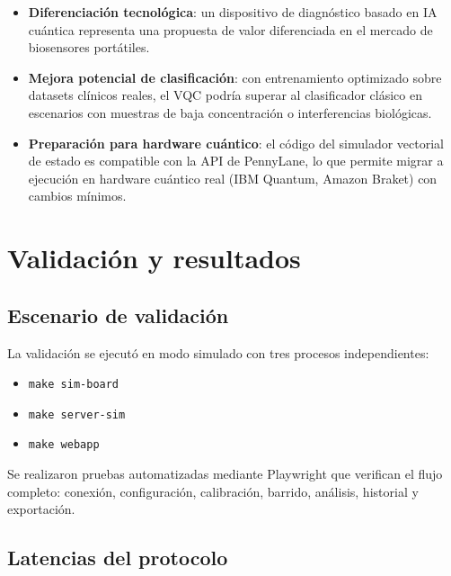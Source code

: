 \documentclass[11pt,a4paper,spanish]{book}
\begin{document}
\begin{itemize}
	\item \textbf{Diferenciaci\'{o}n tecnol\'{o}gica}: un dispositivo de diagn\'{o}stico basado en IA cu\'{a}ntica representa una propuesta de valor diferenciada en el mercado de biosensores port\'{a}tiles.
	\item \textbf{Mejora potencial de clasificaci\'{o}n}: con entrenamiento optimizado sobre datasets cl\'{i}nicos reales, el VQC podr\'{i}a superar al clasificador cl\'{a}sico en escenarios con muestras de baja concentraci\'{o}n o interferencias biol\'{o}gicas.
	\item \textbf{Preparaci\'{o}n para hardware cu\'{a}ntico}: el c\'{o}digo del simulador vectorial de estado es compatible con la API de PennyLane, lo que permite migrar a ejecuci\'{o}n en hardware cu\'{a}ntico real (IBM Quantum, Amazon Braket) con cambios m\'{i}nimos.
\end{itemize}

\chapter{Validaci\'{o}n y resultados}

\section{Escenario de validaci\'{o}n}

La validaci\'{o}n se ejecut\'{o} en modo simulado con tres procesos independientes:
\begin{itemize}
	\item \texttt{make sim-board}
	\item \texttt{make server-sim}
	\item \texttt{make webapp}
\end{itemize}

Se realizaron pruebas automatizadas mediante Playwright que verifican el flujo completo: conexi\'{o}n, configuraci\'{o}n, calibraci\'{o}n, barrido, an\'{a}lisis, historial y exportaci\'{o}n.

\section{Latencias del protocolo}
\end{document}
